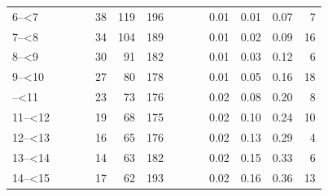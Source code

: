 \documentclass[]{elsarticle} %
\begin{document}
\begin{table}[H]
\begin{tabular}[t]{l>{}r>{}r>{}rrrr>{}r>{}r>{}rrrrr}
6--<7 & \cellcolor[HTML]{ececec}{0.04} & \cellcolor[HTML]{ececec}{0.07} & \cellcolor[HTML]{ececec}{0.37} & 38 & 119 & 196 & \cellcolor[HTML]{ececec}{0.25} & \cellcolor[HTML]{ececec}{0.50} & \cellcolor[HTML]{ececec}{2.78} & 0.01 & 0.01 & 0.07 & 7\\
7--<8 & \cellcolor[HTML]{ececec}{0.04} & \cellcolor[HTML]{ececec}{0.11} & \cellcolor[HTML]{ececec}{0.49} & 34 & 104 & 189 & \cellcolor[HTML]{ececec}{0.32} & \cellcolor[HTML]{ececec}{0.85} & \cellcolor[HTML]{ececec}{3.81} & 0.01 & 0.02 & 0.09 & 16\\
8--<9 & \cellcolor[HTML]{ececec}{0.04} & \cellcolor[HTML]{ececec}{0.17} & \cellcolor[HTML]{ececec}{0.66} & 30 & 91 & 182 & \cellcolor[HTML]{ececec}{0.42} & \cellcolor[HTML]{ececec}{1.44} & \cellcolor[HTML]{ececec}{5.13} & 0.01 & 0.03 & 0.12 & 6\\
9--<10 & \cellcolor[HTML]{ececec}{0.04} & \cellcolor[HTML]{ececec}{0.26} & \cellcolor[HTML]{ececec}{0.86} & 27 & 80 & 178 & \cellcolor[HTML]{ececec}{0.53} & \cellcolor[HTML]{ececec}{2.27} & \cellcolor[HTML]{ececec}{6.72} & 0.01 & 0.05 & 0.16 & 18\\
\addlinespace
10--<11 & \cellcolor[HTML]{ececec}{0.04} & \cellcolor[HTML]{ececec}{0.36} & \cellcolor[HTML]{ececec}{1.07} & 23 & 73 & 176 & \cellcolor[HTML]{ececec}{0.64} & \cellcolor[HTML]{ececec}{3.27} & \cellcolor[HTML]{ececec}{8.53} & 0.02 & 0.08 & 0.20 & 8\\
11--<12 & \cellcolor[HTML]{ececec}{0.03} & \cellcolor[HTML]{ececec}{0.45} & \cellcolor[HTML]{ececec}{1.25} & 19 & 68 & 175 & \cellcolor[HTML]{ececec}{0.75} & \cellcolor[HTML]{ececec}{4.35} & \cellcolor[HTML]{ececec}{10.40} & 0.02 & 0.10 & 0.24 & 10\\
12--<13 & \cellcolor[HTML]{ececec}{0.03} & \cellcolor[HTML]{ececec}{0.52} & \cellcolor[HTML]{ececec}{1.38} & 16 & 65 & 176 & \cellcolor[HTML]{ececec}{0.84} & \cellcolor[HTML]{ececec}{5.37} & \cellcolor[HTML]{ececec}{12.23} & 0.02 & 0.13 & 0.29 & 4\\
13--<14 & \cellcolor[HTML]{ececec}{0.04} & \cellcolor[HTML]{ececec}{0.55} & \cellcolor[HTML]{ececec}{1.46} & 14 & 63 & 182 & \cellcolor[HTML]{ececec}{0.91} & \cellcolor[HTML]{ececec}{6.24} & \cellcolor[HTML]{ececec}{13.89} & 0.02 & 0.15 & 0.33 & 6\\
14--<15 & \cellcolor[HTML]{ececec}{0.05} & \cellcolor[HTML]{ececec}{0.56} & \cellcolor[HTML]{ececec}{1.49} & 17 & 62 & 193 & \cellcolor[HTML]{ececec}{0.96} & \cellcolor[HTML]{ececec}{6.89} & \cellcolor[HTML]{ececec}{15.32} & 0.02 & 0.16 & 0.36 & 13\\

\end{tabular}
\end{table}
\end{document}
